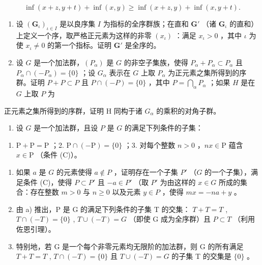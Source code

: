 \[
\inf (x + z, y + t) + \inf (x, y) \geqslant \inf (x + z, y) + \inf (x, y + t).
\]

\begin{enumerate}
\def\labelenumi{\arabic{enumi})}
\setcounter{enumi}{17}
\item
  设 \((\mathbf{G}_{\iota})_{\iota \in I}\) 是以良序集 \(I\) 为指标的全序群族；在直和 \(\mathbf{G}'\) （诸 \(\mathbf{G}_{\iota}\) 的直和）上定义一个序，取严格正元素为这样的非零 \((x_{\iota})\) ：满足 \(x_{\iota} > 0\) ，其中 \(\iota\) 为使 \(x_{\iota} \neq 0\) 的第一个指标。证明 \(\mathbf{G}'\) 是全序的。
\item
  设 \(G\) 是一个加法群，\((P_{\alpha})\) 是 \(G\) 的非空子集族，使得 \(P_{\alpha} + P_{\alpha} \subset P_{\alpha}\) 且 \(P_{\alpha} \cap (-P_{\alpha}) = \{0\}\) ；设 \(G_{\alpha}\) 表示在 \(G\) 上取 \(P_{\alpha}\) 为正元素之集所得到的序群。证明 \(P + P \subset P\) 且 \(P \cap (-P) = \{0\}\) ，其中 \(P = \bigcap_{\alpha} P_{\alpha}\) ；如果 \(H\) 是在 \(G\) 上取 \(P\) 为
\end{enumerate}

正元素之集所得到的序群，证明 H 同构于诸 \(G_{\alpha}\) 的乘积的对角子群。

\begin{enumerate}
\def\labelenumi{\arabic{enumi})}
\setcounter{enumi}{19}
\tightlist
\item
  设 \(G\) 是一个加法群，且设 \(P\) 是 \(G\) 的满足下列条件的子集：
\end{enumerate}

\begin{enumerate}
\def\labelenumi{\arabic{enumi}.}
\tightlist
\item
  \(\mathrm{P} + \mathrm{P} = \mathrm{P}\) ；2. \(\mathrm{P} \cap (-\mathrm{P}) = \{0\}\) ；3. 对每个整数 \(n > 0\) ，\(nx \in \mathrm{P}\) 蕴含 \(x \in \mathrm{P}\) （条件 (C)）。
\end{enumerate}

\begin{enumerate}
\def\labelenumi{\alph{enumi})}
\item
  如果 \(a\) 是 \(G\) 的元素使得 \(a \notin P\) ，证明存在一个子集 \(P'\) （\(G\) 的一个子集），满足条件 (C)，使得 \(P \subset P'\) 且 \(-a \in P'\) （取 \(P'\) 为由这样的 \(x \in G\) 所成的集合：存在整数 \(m > 0\) 与 \(n \geqslant 0\) 以及元素 \(y \in P\) ，使得 \(mx = -na + y\) 。
\item
  由 a) 推出，P 是 G 的满足下列条件的子集 T 的交集： \(T + T = T\) , \(T \cap (-T) = \{0\}\) , \(T \cup (-T) = G\) （即使 G 成为全序群）且 \(P \subset T\) （利用佐恩引理）。
\item
  特别地，若 G 是一个每个非零元素均无限阶的加法群，则 G 的所有满足 \(T + T = T\) , \(T \cap (-T) = \{0\}\) 且 \(T \cup (-T) = G\) 的子集 T 的交集是 \(\{0\}\) 。
\end{enumerate}

